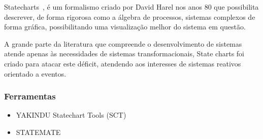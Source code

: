 Statecharts~\cite{Harel:1987:SVF:34884.34886}, é um formalismo criado por
David Harel nos anos 80 que possibilita descrever, de forma rigorosa como a
álgebra de processos, sistemas complexos de forma gráfica, possibilitando uma
visualização melhor do sistema em questão.

A grande parte da literatura que compreende o desenvolvimento de sistemas atende
apenas às necessidades de sistemas transformacionais, State charts foi criado para
atacar este déficit, atendendo aos interesses de sistemas reativos orientado a eventos.

\subsubsection{Ferramentas}
\begin{itemize}

\item{YAKINDU Statechart Tools (SCT)}
\item{STATEMATE}

\end{itemize}
